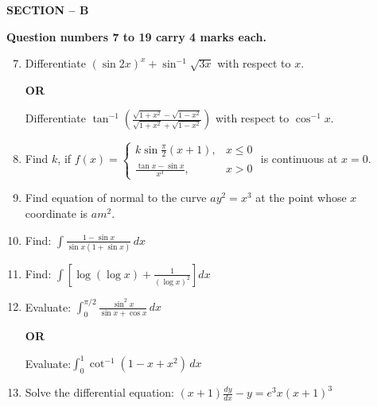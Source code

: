 \documentclass[12pt]{article}
\begin{document}
\vspace{0.5cm}
\begin{center}
    \textbf{SECTION -- B}
\end{center}


\vspace{0.3cm}

\textbf{Question numbers 7 to 19 carry 4 marks each.}

\begin{enumerate}[leftmargin=*]
\setcounter{enumi}{6}

\item Differentiate $(\sin 2x)^x+\sin^{-1}\sqrt{3x}$ with respect to $x$.
\begin{center}
    { \textbf{OR}
   }
\end{center}


Differentiate 
$
\displaystyle
\tan^{-1}\left(
\frac{\sqrt{1+x^2}-\sqrt{1-x^2}}
{\sqrt{1+x^2}+\sqrt{1-x^2}}
\right)
$
with respect to 
$
\displaystyle \cos^{-1}x
$.

\item Find $k$, if
$
\displaystyle
f(x)=
\begin{cases}
k\sin \frac{\pi}{2}(x+1), & x \leq 0 \\[12pt]
\frac{\tan x-\sin x}{x^3}, & x>0
\end{cases}
$
is continuous at $x=0$.

\item Find equation of normal to the curve 
$
\displaystyle ay^2=x^3
$
at the point whose $x$ coordinate is 
$
\displaystyle am^2
$.

\item Find:
$
\displaystyle
\int \frac{1-\sin x}{\sin x(1+\sin x)}\,dx
$

\item Find:
$
\displaystyle
\int \left[\log(\log x)+\frac{1}{(\log x)^2}\right]dx
$

\item Evaluate:
$
\displaystyle
\int_{0}^{\pi/2}\frac{\sin^{2}x}{\sin x+\cos x}\,dx
$

\begin{center}
\textbf{OR}
\end{center}

Evaluate:$\displaystyle\int_{0}^{1}{\cot^{-1}}(1-x+x^2)\,dx$


\item Solve the differential equation:
$
\displaystyle
(x+1)\frac{dy}{dx}-y=e^3x(x+1)^3
$
\end{enumerate}
\end{document}

